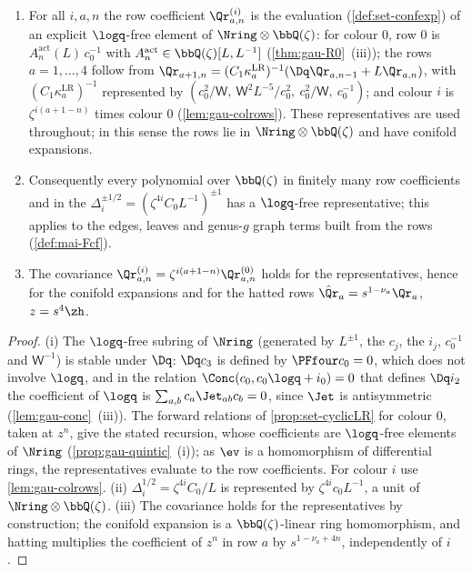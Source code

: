 \begin{cor}
\label{cor:gau-rowsNN}
\begin{enumerate}
\item For all $i,a,n$ the row coefficient $\Qr^{(i)}_{a,n}$ is the evaluation (\cref{def:set-confexp}) of an explicit $\logq$-free element of $\Nring\otimes\bbQ(\zeta)$: for colour $0$, row $0$ is $A^{\mathrm{act}}_n(L)\,c_0^{-1}$ with $A^{\mathrm{act}}_n\in\bbQ(\zeta)[L,L^{-1}]$ (\cref{thm:gau-R0}~(iii)); the rows $a=1,\dots,4$ follow from $\Qr_{a+1,n}=(C_1\kappa^{\mathrm{LR}}_a)^{-1}(\Dq\Qr_{a,n-1}+L\Qr_{a,n})$, with $(C_1\kappa^{\mathrm{LR}}_a)^{-1}$ represented by $(c_0^2/\mathsf W,\ \mathsf W^2L^{-5}/c_0^2,\ c_0^2/\mathsf W,\ c_0^{-1})$; and colour $i$ is $\zeta^{i(a+1-n)}$ times colour $0$ (\cref{lem:gau-colrows}). These representatives are used throughout; in this sense the rows lie in $\Nring\otimes\bbQ(\zeta)$ and have conifold expansions.
\item Consequently every polynomial over $\bbQ(\zeta)$ in finitely many row coefficients and in the $\Delta_i^{\pm1/2}=(\zeta^{4i}C_0L^{-1})^{\pm1}$ has a $\logq$-free representative; this applies to the edges, leaves and genus-$g$ graph terms built from the rows (\cref{def:mai-Fcf}).
\item The covariance $\Qr^{(i)}_{a,n}=\zeta^{i(a+1-n)}\Qr^{(0)}_{a,n}$ holds for the representatives, hence for the conifold expansions and for the hatted rows $\hat{\Qr}_a=s^{1-\nu_a}\Qr_a$, $z=s^4\zh$.
\end{enumerate}
\end{cor}

\begin{proof}
(i) The $\logq$-free subring of $\Nring$ (generated by $L^{\pm1}$, the $c_j$, the $i_j$, $c_0^{-1}$ and $\mathsf W^{-1}$) is stable under $\Dq$: $\Dq c_3$ is defined by $\PFfour c_0=0$, which does not involve $\logq$, and in the relation $\Conc(c_0,c_0\logq+i_0)=0$ that defines $\Dq i_2$ the coefficient of $\logq$ is $\sum_{a,b}c_a\Jet_{ab}c_b=0$, since $\Jet$ is antisymmetric (\cref{lem:gau-conc}~(iii)). The forward relations of \cref{prop:set-cyclicLR} for colour $0$, taken at $z^n$, give the stated recursion, whose coefficients are $\logq$-free elements of $\Nring$ (\cref{prop:gau-quintic}~(i)); as $\ev$ is a homomorphism of differential rings, the representatives evaluate to the row coefficients. For colour $i$ use \cref{lem:gau-colrows}. (ii) $\Delta_i^{1/2}=\zeta^{4i}C_0/L$ is represented by $\zeta^{4i}c_0L^{-1}$, a unit of $\Nring\otimes\bbQ(\zeta)$. (iii) The covariance holds for the representatives by construction; the conifold expansion is a $\bbQ(\zeta)$-linear ring homomorphism, and hatting multiplies the coefficient of $z^n$ in row $a$ by $s^{1-\nu_a+4n}$, independently of $i$.
\end{proof}

